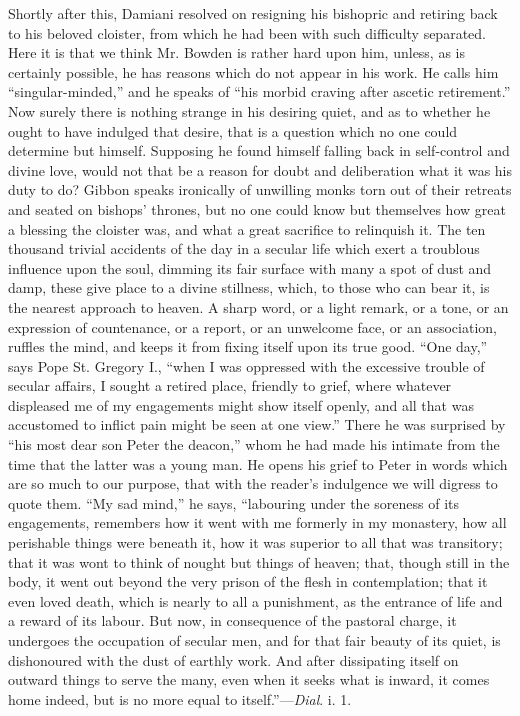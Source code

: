 Shortly after this, Damiani resolved on resigning
his bishopric and retiring back to his beloved cloister, from which he
had been with such difficulty separated. Here it is that we think Mr.
Bowden is rather hard upon him, unless, as is certainly possible, he
has reasons which do not appear in his work. He calls him ``singular-minded,''
and he speaks of ``his morbid craving after ascetic retirement.'' Now
surely there is nothing strange in his desiring quiet, and as to
whether he ought to have indulged that desire, that is a question
which no one could determine but himself. Supposing he found himself
falling back in self-control and divine love, would not that be a
reason for doubt and deliberation what it was his duty to do? Gibbon
speaks ironically of unwilling monks torn out of their retreats and
seated on bishops' thrones, but no one could know but themselves
how great a blessing the cloister was, and what a great sacrifice to
relinquish it. The ten thousand trivial accidents of the day in a
secular life which exert a troublous influence upon the soul, dimming
its fair surface with many a spot of dust and damp, these give place
to a divine stillness, which, to those who can bear it, is the nearest
approach to heaven. A sharp word, or a light remark, or a tone, or an
expression of countenance, or a report, or an unwelcome face, or an
association, ruffles the mind, and keeps it from fixing itself upon
its true good. ``One day,'' says Pope St. Gregory I., ``when I was
oppressed with the excessive trouble of secular affairs, I sought a
retired place, friendly to grief, where whatever displeased me of my
engagements might show itself openly, and all that was accustomed to
inflict pain might be seen at one view.'' There he was surprised by ``his
most dear son Peter the deacon,'' whom he had made his intimate from
the time that the latter was a young man. He opens his grief to Peter
in words which are so much to our purpose, that with the reader's
indulgence we will digress to quote them. ``My sad mind,'' he says, ``labouring
under the soreness of its engagements, remembers how it went with me
formerly in my monastery, how all perishable things were beneath it,
how it was superior to all that was transitory; that it was wont to
think of nought but things of heaven; that, though still in the body,
it went out beyond the very prison of the flesh in contemplation; that
it even loved death, which is nearly to all a punishment, as the
entrance of life and a reward of its labour. But now, in consequence
of the pastoral charge, it undergoes the occupation of secular men,
and for that fair beauty of its quiet, is dishonoured with the dust of
earthly work. And after dissipating itself on outward things to
serve the many, even when it seeks what is inward, it comes home
indeed, but is no more equal to itself.''—\emph{Dial}. i. 1.

